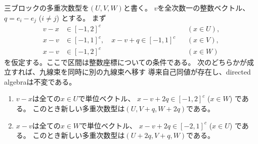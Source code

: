 \begin{lemma}[純代数的な同時変換]
\label{lem:ou-additive-elementary-move}
三ブロックの多重次数型を$(U,V,W)$と書く。
$v$を全次数一の整数ベクトル、$q=e_i-e_j$ ($i\ne j$) とする。
まず
\begin{align*}
 v-x&\in[-1,2]^c &&(x\in U),\\
 x-v&\in[-1,1]^c,\quad x-v+q\in[-1,1]^c &&(x\in V),\\
 x-v&\in[-1,2]^c &&(x\in W)
\end{align*}
を仮定する。ここで区間は整数座標についての条件である。
次のどちらかが成立すれば、九線束を同時に別の九線束へ移す
導来自己同値が存在し、directed algebraは不変である。
\begin{enumerate}[label=(\roman*)]
\item $v-x$は全ての$x\in U$で単位ベクトル、
      $x-v+2q\in[-1,2]^c$ ($x\in W$) である。
      このとき新しい多重次数型は$(U,V+q,W+2q)$である。
\item $x-v$は全ての$x\in W$で単位ベクトル、
      $x-v+2q\in[-2,1]^c$ ($x\in U$) である。
      このとき新しい多重次数型は$(U+2q,V+q,W)$である。
\end{enumerate}
\end{lemma}
